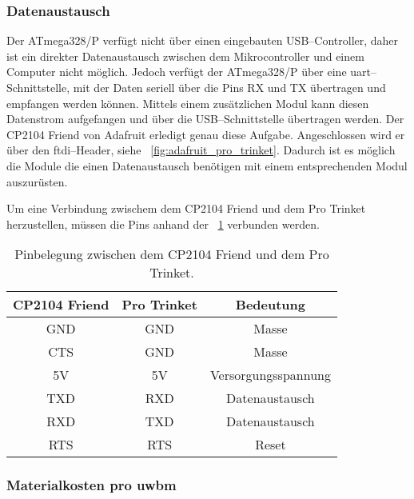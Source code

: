\subsubsection{Datenaustausch}

Der ATmega328/P verfügt nicht über einen eingebauten USB--Controller, daher ist ein direkter Datenaustausch zwischen dem Mikrocontroller und einem Computer nicht möglich. Jedoch verfügt der ATmega328/P über eine \gls{uart}--Schnittstelle, mit der Daten seriell über die Pins RX und TX übertragen und empfangen werden können. Mittels einem zusätzlichen Modul kann diesen Datenstrom aufgefangen und über die USB--Schnittstelle übertragen werden. Der CP2104 Friend von Adafruit erledigt genau diese Aufgabe. Angeschlossen wird er über den  \gls{ftdi}--Header, siehe \figurename~\ref{fig:adafruit_pro_trinket}. Dadurch ist es möglich die Module die einen Datenaustausch benötigen mit einem entsprechenden Modul auszurüsten.

Um eine Verbindung zwischem dem CP2104 Friend und dem Pro Trinket herzustellen, müssen die Pins anhand der \tablename~\ref{tab:pin_assignment_between_cp2104_and_pro_trinket} verbunden werden.

\begin{table}
	\centering
	\begin{tabular}{||c|c|c||} 
		\hline
		CP2104 Friend & Pro Trinket & Bedeutung\\\hline
		\hline
		GND & GND & Masse\\\hline
		CTS & GND & Masse\\\hline
		\hline
		5V & 5V & Versorgungsspannung\\\hline
		\hline
		TXD & RXD & Datenaustausch\\\hline
		RXD & TXD & Datenaustausch\\\hline
		\hline
		RTS & RTS & Reset\\\hline
	\end{tabular}
	\caption{Pinbelegung zwischen dem CP2104 Friend und dem Pro Trinket.}
	\label{tab:pin_assignment_between_cp2104_and_pro_trinket}
\end{table}


\begin{comment}
- Kosten für den Aufbau
------------------------------------------------------------------------------------------
\end{comment}
\subsubsection{Materialkosten pro \gls{uwbm}}

